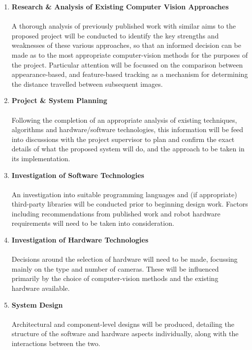\documentclass[10pt,fleqn,twoside]{article}
\begin{document}
\begin{enumerate}
	\item \textbf{Research \& Analysis of Existing Computer Vision Approaches} \\\\  A thorough analysis of previously published work with similar aims to the proposed project will be conducted to identify the key strengths and weaknesses of these various approaches, so that an informed decision can be made as to the most appropriate computer-vision methods for the purposes of the project. Particular attention will be focussed on the comparison between appearance-based, and feature-based tracking as a mechanism for determining the distance travelled between subsequent images. 
	
	\item \textbf{Project \& System Planning} \\\\ Following the completion of an appropriate analysis of existing techniques, algorithms and hardware/software technologies, this information will be feed into discussions with the project supervisor to plan and confirm the exact details of what the proposed system will do, and the approach to be taken in its implementation.

	\item \textbf{Investigation of Software Technologies} \\\\ An investigation into suitable programming languages and (if appropriate) third-party libraries will be conducted prior to beginning design work. Factors including recommendations from published work and robot hardware requirements will need to be taken into consideration.
	
	\item \textbf{Investigation of Hardware Technologies} \\\\ Decisions around the selection of hardware will need to be made, focussing mainly on the type and number of cameras. These will be influenced primarily by the choice of computer-vision methods and the existing hardware available.

	\item \textbf{System Design} \\\\ Architectural and component-level designs will be produced, detailing the structure of the software and hardware aspects individually, along with the interactions between the two.
	

\end{enumerate}
\end{document}
